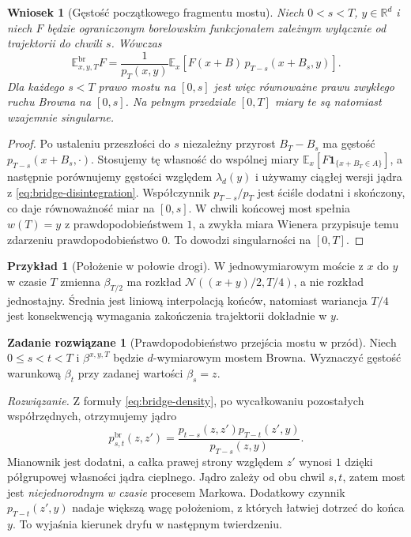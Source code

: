 \documentclass[11pt,a4paper,oneside]{report}
\numberwithin{equation}{chapter}
\theoremstyle{plain}
\newtheorem{wniosek}[twierdzenie]{Wniosek}
\theoremstyle{definition}
\newtheorem{przyklad}{Przykład}[chapter]
\newtheorem{zadanie}{Zadanie rozwiązane}[chapter]
\theoremstyle{remark}
\newcommand{\R}{\mathbb{R}}
\newcommand{\E}{\mathbb{E}}
\newcommand{\ind}[1]{\mathbf{1}_{#1}}
\newcommand{\Normal}{\mathcal{N}}
\begin{document}
\begin{wniosek}[Gęstość początkowego fragmentu mostu]
\label{cor:bridge-initial-density}
Niech $0<s<T$, $y\in\R^d$ i niech $F$ będzie
ograniczonym borelowskim funkcjonałem zależnym wyłącznie
od trajektorii do chwili $s$. Wówczas
\[
 \E_{x,y,T}^{\mathrm{br}}F
 =\frac{1}{p_T(x,y)}\E_x\left[
    F(x+B)\,p_{T-s}(x+B_s,y)\right].
\tag{15.3}\label{eq:bridge-likelihood}
\]
Dla każdego $s<T$ prawo mostu na $[0,s]$ jest więc
równoważne prawu zwykłego ruchu Browna na $[0,s]$.
Na pełnym przedziale $[0,T]$ miary te są natomiast
wzajemnie singularne.
\end{wniosek}
\begin{proof}
Po ustaleniu przeszłości do $s$ niezależny przyrost
$B_T-B_s$ ma gęstość $p_{T-s}(x+B_s,\cdot)$.
Stosujemy tę własność do wspólnej miary
$\E_x[F\ind{\{x+B_T\in A\}}]$, a następnie porównujemy
gęstości względem $\lambda_d(y)$ i używamy ciągłej wersji
jądra z \eqref{eq:bridge-disintegration}. Współczynnik
$p_{T-s}/p_T$ jest ściśle dodatni i skończony,
co daje równoważność miar na $[0,s]$.
W chwili końcowej most spełnia $w(T)=y$ z
prawdopodobieństwem $1$, a zwykła miara Wienera przypisuje
temu zdarzeniu prawdopodobieństwo $0$. To dowodzi
singularności na $[0,T]$.
\end{proof}

\begin{przyklad}[Położenie w połowie drogi]
W jednowymiarowym moście z $x$ do $y$ w czasie $T$
zmienna $\beta_{T/2}$ ma rozkład
$\Normal((x+y)/2,T/4)$, a nie rozkład jednostajny.
Średnia jest liniową interpolacją końców, natomiast
wariancja $T/4$ jest konsekwencją wymagania zakończenia
trajektorii dokładnie w $y$.
\end{przyklad}



\begin{zadanie}[Prawdopodobieństwo przejścia mostu w przód]
Niech $0\le s<t<T$ i $\beta^{x,y,T}$ będzie
$d$-wymiarowym mostem Browna. Wyznaczyć gęstość warunkową
$\beta_t$ przy zadanej wartości $\beta_s=z$.

\emph{Rozwiązanie.} Z formuły
\eqref{eq:bridge-density}, po wycałkowaniu pozostałych
współrzędnych, otrzymujemy jądro
\[
 p^{\mathrm{br}}_{s,t}(z,z')=
 \frac{p_{t-s}(z,z')p_{T-t}(z',y)}{p_{T-s}(z,y)}.
\]
Mianownik jest dodatni, a całka prawej strony względem
$z'$ wynosi $1$ dzięki półgrupowej własności jądra
cieplnego. Jądro zależy od obu chwil $s,t$, zatem most
jest \emph{niejednorodnym w czasie} procesem Markowa.
Dodatkowy czynnik $p_{T-t}(z',y)$ nadaje większą wagę
położeniom, z których łatwiej dotrzeć do końca $y$.
To wyjaśnia kierunek dryfu w następnym twierdzeniu.
\end{zadanie}
\end{document}
